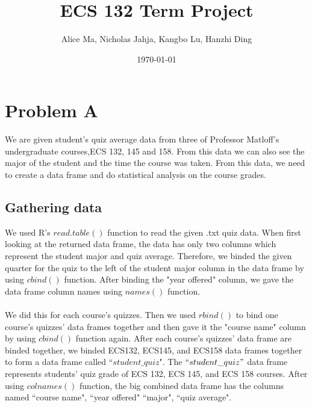 \documentclass{article}
\title{ECS 132 Term Project}
\author{Alice Ma, Nicholas Jahja, Kangbo Lu, Hanzhi Ding}
\date{\today}
\begin{document}
\maketitle


\section{Problem A}
We are given student's quiz average data from three of Professor Matloff's undergraduate courses,ECS 132, 145 and 158. From this data we can also see the major of the student and the time the course was taken. From this data, we need to create a data frame and do statistical analysis on the course grades. 
    \subsection{Gathering data}
        We used R's $read.table()$ function to read the given .txt quiz data. When first looking at the returned data frame, the data has only two columns which represent the student major and quiz average. Therefore, we binded the given quarter for the quiz to the left of the student major column in the data frame by using $cbind()$ function. After binding the "year offered" column, we gave the data frame column names using $names()$ function.\\ \\
        We did this for each course's quizzes. Then we used $rbind()$ to bind one course's quizzes' data frames together and then gave it the "course name" column by using $cbind()$ function again.
        After each course's quizzes' data frame are binded together, we binded ECS132, ECS145, and ECS158 data frames together to form a data frame called ``${student\_quiz}$". The $``student\_quiz"$ data frame represents students' quiz grade of ECS 132, ECS 145, and ECS 158 courses. After using $colnames()$ function, the big combined data frame has the columns named ``course name", ``year offered" ``major", ``quiz average".
        
\end{document}
